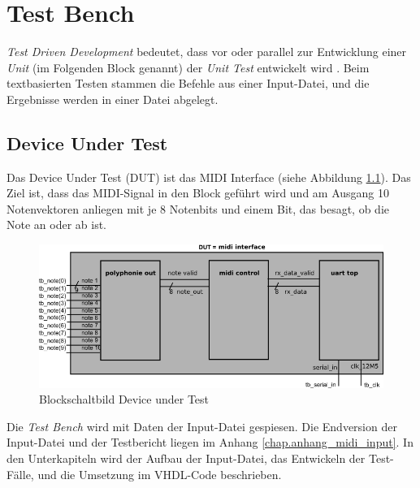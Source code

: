 
\chapter{Test Bench}\label{chap.testen}

\textit{Test Driven Development} bedeutet, dass vor oder parallel zur Entwicklung einer \textit{Unit} (im Folgenden Block genannt) der \textit{Unit Test} entwickelt wird \citep{Testdriven}. Beim textbasierten Testen stammen die Befehle aus einer Input-Datei, und die Ergebnisse werden in einer Datei abgelegt. 

\section{Device Under Test}\label{sec.testbench_DUT}

Das Device Under Test (DUT) ist das MIDI Interface (siehe Abbildung \ref{fig.testbench}). Das Ziel ist, dass das MIDI-Signal in den Block geführt wird und am Ausgang 10 Notenvektoren anliegen mit je 8 Notenbits und einem Bit, das besagt, ob die Note an oder ab ist.

\begin{figure}[H]
	\includegraphics[width=1\textwidth]{images/midi_interface/testbench_midiinterface.png}
	\caption{Blockschaltbild Device under Test}
	\label{fig.testbench}
\end{figure} 

Die \textit{Test Bench} wird mit Daten der Input-Datei gespiesen. Die Endversion der Input-Datei und der Testbericht liegen im Anhang \ref{chap.anhang_midi_input}. 
In den Unterkapiteln wird der Aufbau der Input-Datei, das Entwickeln der Test-Fälle, und die Umsetzung im VHDL-Code beschrieben.

